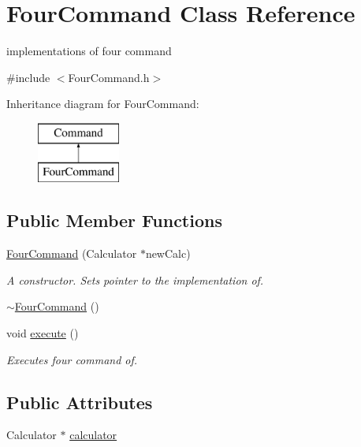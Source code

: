 \hypertarget{class_four_command}{}\section{Four\+Command Class Reference}
\label{class_four_command}


implementations of four command  




{\ttfamily \#include $<$Four\+Command.\+h$>$}

Inheritance diagram for Four\+Command\+:\begin{figure}[H]
\begin{center}
\leavevmode
\includegraphics[height=2.000000cm]{class_four_command}
\end{center}
\end{figure}
\subsection*{Public Member Functions}
\begin{DoxyCompactItemize}
\item 
\hyperlink{class_four_command_acba8d0c8c5e4951816c271015f22095e}{Four\+Command} (Calculator $\ast$new\+Calc)
\begin{DoxyCompactList}\small\item\em A constructor. Sets pointer to the implementation of. \end{DoxyCompactList}\item 
\hyperlink{class_four_command_a09be088ecb4c4cf63b01144af97de3b9}{$\sim$\+Four\+Command} ()
\item 
void \hyperlink{class_four_command_abc26a6d79d1897ab73b963f7737315ef}{execute} ()
\begin{DoxyCompactList}\small\item\em Executes four command of. \end{DoxyCompactList}\end{DoxyCompactItemize}
\subsection*{Public Attributes}
\begin{DoxyCompactItemize}
\item 
Calculator $\ast$ \hyperlink{class_four_command_a3a411398976791c35d4a3c131f592116}{calculator}
\end{DoxyCompactItemize}


